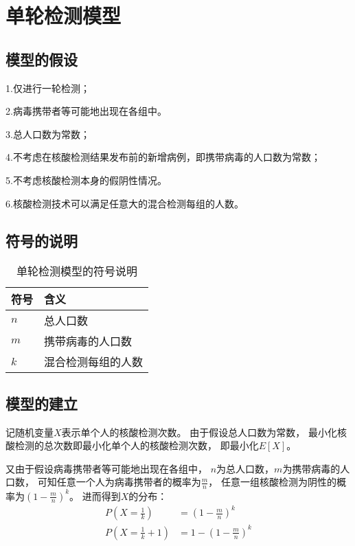 \documentclass[12pt]{article}
\begin{document}
\newpage
{\centering\section{单轮检测模型}}

\subsection{模型的假设}

1.仅进行一轮检测；

2.病毒携带者等可能地出现在各组中。

3.总人口数为常数；

4.不考虑在核酸检测结果发布前的新增病例，即携带病毒的人口数为常数；

5.不考虑核酸检测本身的假阴性情况。

6.核酸检测技术可以满足任意大的混合检测每组的人数。

\subsection{符号的说明}

\begin{table}[h]
\centering
\begin{tabular}{|l|l|} 
\hline
符号 & 含义 \\
\hline
$n$ & 总人口数 \\
$m$ & 携带病毒的人口数 \\
$k$ & 混合检测每组的人数 \\
\hline
\end{tabular}
\caption{单轮检测模型的符号说明}
\end{table}

\subsection{模型的建立}

记随机变量$X$表示单个人的核酸检测次数。
由于假设总人口数为常数，
最小化核酸检测的总次数即最小化单个人的核酸检测次数，
即最小化$E[X]$。

又由于假设病毒携带者等可能地出现在各组中，
$n$为总人口数，$m$为携带病毒的人口数，
可知任意一个人为病毒携带者的概率为$\frac{m}{n}$，
任意一组核酸检测为阴性的概率为$(1 - \frac{m}{n})^k$。
进而得到$X$的分布：
\begin{align*}
P(X = \frac{1}{k}) &= (1 - \frac{m}{n})^k \\
P(X = \frac{1}{k} + 1) &= 1 - (1 - \frac{m}{n})^k
\end{align*}
\end{document}
